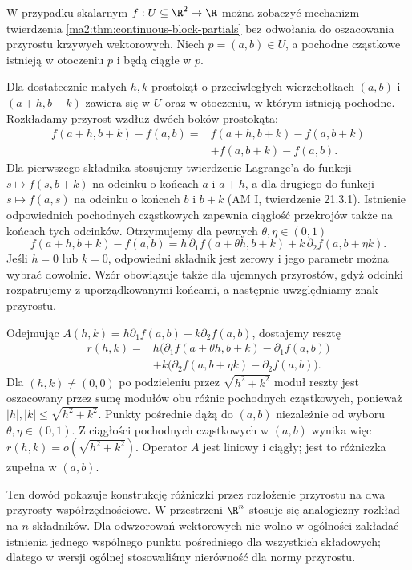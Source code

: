 W przypadku skalarnym $f:U\subseteq\R^2\to\R$
można zobaczyć mechanizm twierdzenia
\ref{ma2:thm:continuous-block-partials} bez odwołania
do oszacowania przyrostu krzywych wektorowych.
Niech $p=(a,b)\in U$, a pochodne cząstkowe istnieją
w otoczeniu $p$ i będą ciągłe w $p$.

Dla dostatecznie małych $h,k$ prostokąt o przeciwległych
wierzchołkach $(a,b)$ i $(a+h,b+k)$ zawiera się w $U$
oraz w otoczeniu, w którym istnieją pochodne.
Rozkładamy przyrost wzdłuż dwóch boków prostokąta:
\begin{align*}
 f(a+h,b+k)-f(a,b)
 ={}&f(a+h,b+k)-f(a,b+k)\\
 &+f(a,b+k)-f(a,b).
\end{align*}
Dla pierwszego składnika stosujemy twierdzenie
Lagrange'a do funkcji $s\mapsto f(s,b+k)$ na odcinku
o końcach $a$ i $a+h$, a dla drugiego do funkcji
$s\mapsto f(a,s)$ na odcinku o końcach $b$ i $b+k$
(AM I, twierdzenie 21.3.1).
Istnienie odpowiednich pochodnych cząstkowych zapewnia
ciągłość przekrojów także na końcach tych odcinków.
Otrzymujemy dla pewnych $\theta,\eta\in(0,1)$
\[
 f(a+h,b+k)-f(a,b)
 =h\,\partial_1f(a+\theta h,b+k)
  +k\,\partial_2f(a,b+\eta k).
\]
Jeśli $h=0$ lub $k=0$, odpowiedni składnik jest
zerowy i jego parametr można wybrać dowolnie.
Wzór obowiązuje także dla ujemnych przyrostów,
gdyż odcinki rozpatrujemy z uporządkowanymi końcami,
a następnie uwzględniamy znak przyrostu.

Odejmując $A(h,k)=h\partial_1f(a,b)+k\partial_2f(a,b)$,
dostajemy resztę
\begin{align*}
 r(h,k)={}&h\bigl(\partial_1f(a+\theta h,b+k)
                  -\partial_1f(a,b)\bigr)\\
 &+k\bigl(\partial_2f(a,b+\eta k)
                  -\partial_2f(a,b)\bigr).
\end{align*}
Dla $(h,k)\ne(0,0)$ po podzieleniu przez
$\sqrt{h^2+k^2}$ moduł reszty jest oszacowany przez
sumę modułów obu różnic pochodnych cząstkowych,
ponieważ $|h|,|k|\le\sqrt{h^2+k^2}$.
Punkty pośrednie dążą do $(a,b)$ niezależnie od
wyboru $\theta,\eta\in(0,1)$. Z ciągłości pochodnych
cząstkowych w $(a,b)$ wynika więc
$r(h,k)=o(\sqrt{h^2+k^2})$.
Operator $A$ jest liniowy i ciągły; jest to różniczka
zupełna w $(a,b)$.

Ten dowód pokazuje konstrukcję różniczki przez
rozłożenie przyrostu na dwa przyrosty współrzędnościowe.
W przestrzeni $\R^n$ stosuje się analogiczny rozkład
na $n$ składników. Dla odwzorowań wektorowych
nie wolno w ogólności zakładać istnienia jednego
wspólnego punktu pośredniego dla wszystkich składowych;
dlatego w wersji ogólnej stosowaliśmy nierówność
dla normy przyrostu.

